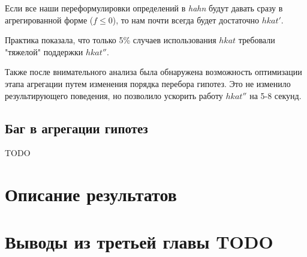 \documentclass[times
              ]{itmo-student-thesis}
\begin{document}
      Если все наши переформулировки определений в  \textit{hahn} будут давать сразу в агрегированной форме ($ f \leq 0 $),
      то нам почти всегда будет достаточно $ hkat' $.

      Практика показала, что только 5\% случаев использования $ hkat $ требовали "тяжелой" поддержки $ hkat'' $.

      Также после внимательного анализа была обнаружена возможность оптимизации этапа агрегации путем изменения порядка перебора гипотез.
      Это не изменило результирующего поведения, но позволило ускорить работу $ hkat'' $ на 5-8 секунд.

    \subsection{Баг в агрегации гипотез}

      TODO

  \section{Описание результатов}

  \section{Выводы из третьей главы TODO}



\end{document}
